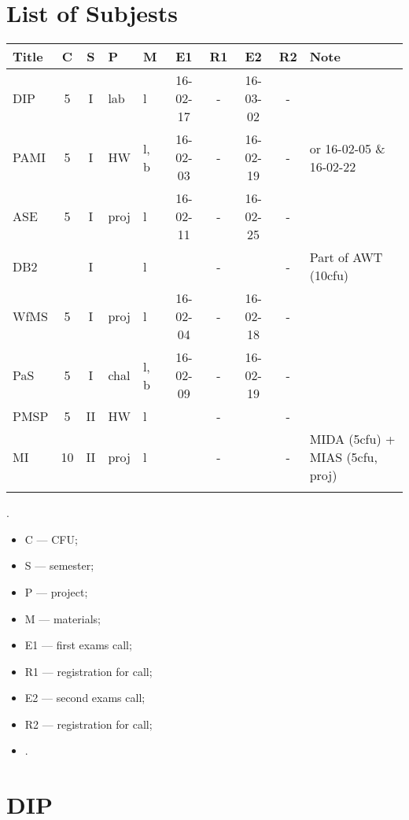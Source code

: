 \documentclass[a4paper,12pt]{article} %
\begin{document}
\tableofcontents

\newpage
\section{List of Subjests}
\begin{tabularx}{\textwidth}{|l|c|c|l|l|c|c|c|c|X|}
	\hline
	Title & C & S & P & M & E1 & R1 & E2 & R2 & Note \\
	\hline
	DIP & 5 & I & lab & l & 16-02-17 & - & 16-03-02 & - &  \\
	\hline
	PAMI & 5 & I & HW & l, b & 16-02-03 & - & 16-02-19 & - & or 16-02-05 \& 16-02-22\\
	\hline
	ASE & 5 & I & proj & l & 16-02-11 & - & 16-02-25 & - &  \\
	\hline
	DB2 &  & I &  & l & & - & & - & Part of AWT (10cfu) \\
	\hline
	WfMS & 5 & I & proj & l & 16-02-04 & - & 16-02-18 & - &  \\
	\hline
	PaS & 5 & I & chal & l, b & 16-02-09 & - & 16-02-19 & - &  \\
	\hline
	PMSP & 5 & II & HW & l & & - & & - &  \\
	\hline
	MI & 10 & II & proj & l & & - & & - & MIDA (5cfu) + MIAS (5cfu, proj) \\
	\hline
	&  &  &  &  &  & & & &  \\
	\hline
\end{tabularx}

.\\

\begin{itemize}
	\item C --- CFU;
	\item S --- semester;
	\item P --- project;
	\item M --- materials;
	\item E1 --- first exams call;
	\item R1 --- registration for call;
	\item E2 --- second exams call;
	\item R2 --- registration for call;
	\item .
\end{itemize}

\newpage
\section{DIP}
\end{document}
